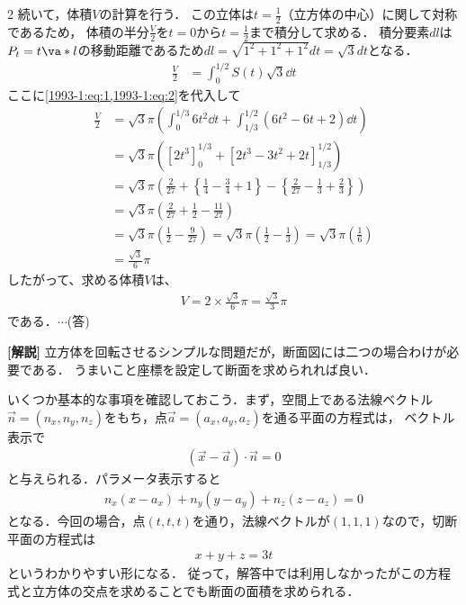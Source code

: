 \documentclass[../../main.tex]{subfiles}
\begin{document}
\begin{multicols}{2}
  \vspace{5pt}
  続いて，体積$V$の計算を行う．
  この立体は$t=\frac{1}{2}$（立方体の中心）に関して対称であるため，
  体積の半分$\frac{V}{2}$を$t=0$から$t=\frac{1}{2}$まで積分して求める．
  積分要素$dl$は$P_t = t\va*{l}$の移動距離であるため$dl = \sqrt{1^2+1^2+1^2}dt = \sqrt{3}dt$となる．
  \begin{align*}
    \frac{V}{2}
     & = \int_{0}^{1/2} S(t) \sqrt{3} \dd t
  \end{align*}
  ここに\cref{1993-1:eq:1,1993-1:eq:2}を代入して
  \begin{align*}
    \frac{V}{2}
     & = \sqrt{3}\pi \left( \int_{0}^{1/3} 6t^2 \dd t + \int_{1/3}^{1/2} (6t^2 - 6t + 2) \dd t \right)                                                         \\
     & = \sqrt{3}\pi \left( \left[ 2t^3 \right]_{0}^{1/3} + \left[ 2t^3 - 3t^2 + 2t \right]_{1/3}^{1/2} \right)                                                \\
     & = \sqrt{3}\pi \left( \frac{2}{27} + \left\{ \frac{1}{4} - \frac{3}{4} + 1 \right\} - \left\{ \frac{2}{27} - \frac{1}{3} + \frac{2}{3} \right\} \right)  \\
     & = \sqrt{3}\pi \left( \frac{2}{27} + \frac{1}{2} - \frac{11}{27} \right)                                                                                 \\
     & = \sqrt{3}\pi \left( \frac{1}{2} - \frac{9}{27} \right) = \sqrt{3}\pi \left( \frac{1}{2} - \frac{1}{3} \right) = \sqrt{3}\pi \left( \frac{1}{6} \right) \\
     & = \frac{\sqrt{3}}{6}\pi
  \end{align*}
  したがって、求める体積$V$は、
  \begin{align*}
    V = 2 \times \frac{\sqrt{3}}{6}\pi = \frac{\sqrt{3}}{3}\pi
  \end{align*}
  である．$\cdots$(答)

  \vspace{10pt}

  {\bf[解説]}
  立方体を回転させるシンプルな問題だが，断面図には二つの場合わけが必要である．
  うまいこと座標を設定して断面を求められれば良い．

  いくつか基本的な事項を確認しておこう．まず，空間上である法線ベクトル$\vec{n}=(n_x,n_y,n_z)$をもち，点$\vec{a}=(a_x,a_y,a_z)$を通る平面の方程式は，
  ベクトル表示で
  \begin{align*}
    \left(\vec{x}-\vec{a}\right)\cdot \vec{n} = 0
  \end{align*}
  と与えられる．パラメータ表示すると
  \begin{align*}
    n_x(x-a_x)+n_y(y-a_y)+n_z(z-a_z)=0
  \end{align*}
  となる．今回の場合，点$(t,t,t)$を通り，法線ベクトルが$(1,1,1)$なので，切断平面の方程式は
  \begin{align*}
    x+y+z=3t
  \end{align*}
  というわかりやすい形になる．
  従って，解答中では利用しなかったがこの方程式と立方体の交点を求めることでも断面の面積を求められる．


\end{multicols}
\end{document}
